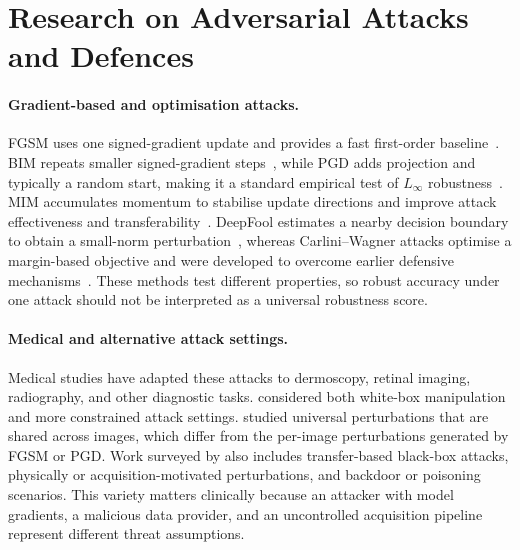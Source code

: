 \documentclass[12pt,a4paper,oneside]{report}
\begin{document}
\section{Research on Adversarial Attacks and Defences}
\label{sec:rw-attacks}


\paragraph{Gradient-based and optimisation attacks.}
FGSM uses one signed-gradient update and provides a fast first-order baseline~\cite{goodfellow2015explaining}. BIM repeats smaller signed-gradient steps~\cite{kurakin2017adversarial}, while PGD adds projection and typically a random start, making it a standard empirical test of $L_\infty$ robustness~\cite{madry2018towards}. MIM accumulates momentum to stabilise update directions and improve attack effectiveness and transferability~\cite{dong2018mim}. DeepFool estimates a nearby decision boundary to obtain a small-norm perturbation~\cite{moosavi2016deepfool}, whereas Carlini--Wagner attacks optimise a margin-based objective and were developed to overcome earlier defensive mechanisms~\cite{carlini2017towards}. These methods test different properties, so robust accuracy under one attack should not be interpreted as a universal robustness score.

\paragraph{Medical and alternative attack settings.}
Medical studies have adapted these attacks to dermoscopy, retinal imaging, radiography, and other diagnostic tasks. \citet{finlayson2019adversarial} considered both white-box manipulation and more constrained attack settings. \citet{hirano2021universal} studied universal perturbations that are shared across images, which differ from the per-image perturbations generated by FGSM or PGD. Work surveyed by \citet{dong2023survey} also includes transfer-based black-box attacks, physically or acquisition-motivated perturbations, and backdoor or poisoning scenarios. This variety matters clinically because an attacker with model gradients, a malicious data provider, and an uncontrolled acquisition pipeline represent different threat assumptions.
\end{document}
